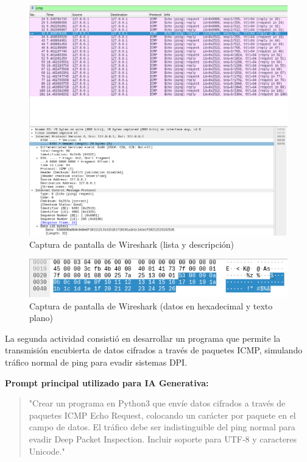 \documentclass[letter,12pt]{article}
\begin{document}
\begin{figure}
    \centering
    \includegraphics[width=1\linewidth]{actividades/Captura desde 2025-09-04 22-28-32.png}
    \caption{Captura de pantalla de Wireshark (lista y descripción)}
    \label{fig:wireshark}
\end{figure}
\begin{figure}
    \centering
    \includegraphics[width=1\linewidth]{actividades/Captura desde 2025-09-04 22-50-18.png}
    \caption{Captura de pantalla de Wireshark (datos en hexadecimal y texto plano)}
    \label{fig:hex-plano}
\end{figure}
La segunda actividad consistió en desarrollar un programa que permite la transmisión encubierta de datos cifrados a través de paquetes ICMP, simulando tráfico normal de ping para evadir sistemas DPI.

\textbf{Prompt principal utilizado para IA Generativa:}
\begin{quote}
"Crear un programa en Python3 que envíe datos cifrados a través de paquetes ICMP Echo Request, colocando un carácter por paquete en el campo de datos. El tráfico debe ser indistinguible del ping normal para evadir Deep Packet Inspection. Incluir soporte para UTF-8 y caracteres Unicode."
\end{quote}
\end{document}
